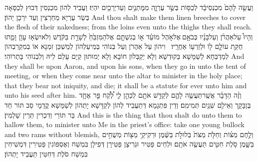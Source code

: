 {וַעֲשֵׂ֤ה לָהֶם֙ מִכְנְסֵי\maqqaf בָ֔ד לְכַסּ֖וֹת בְּשַׂ֣ר עֶרְוָ֑ה מִמׇּתְנַ֥יִם וְעַד\maqqaf יְרֵכַ֖יִם יִהְיֽוּ׃}
{וַעֲבֵיד לְהוֹן מִכְנְסִין דְּבוּץ לְכַסָּאָה בְּשַׂר עֶרְיָא מֵחַרְצִין וְעַד יִרְכָן יְהוֹן׃}
{And thou shalt make them linen breeches to cover the flesh of their nakedness; from the loins even unto the thighs they shall reach.}{}
{וְהָיוּ֩ עַל\maqqaf אַהֲרֹ֨ן וְעַל\maqqaf בָּנָ֜יו בְּבֹאָ֣ם \legarmeh  אֶל\maqqaf אֹ֣הֶל מוֹעֵ֗ד א֣וֹ בְגִשְׁתָּ֤ם אֶל\maqqaf הַמִּזְבֵּ֙חַ֙ לְשָׁרֵ֣ת בַּקֹּ֔דֶשׁ וְלֹא\maqqaf יִשְׂא֥וּ עָוֺ֖ן וָמֵ֑תוּ חֻקַּ֥ת עוֹלָ֛ם ל֖וֹ וּלְזַרְע֥וֹ אַחֲרָֽיו׃ \setuma }
{וִיהוֹן עַל אַהֲרֹן וְעַל בְּנוֹהִי בְּמֵיעַלְהוֹן לְמַשְׁכַּן זִמְנָא אוֹ בְמִקְרַבְהוֹן לְמַדְבְּחָא לְשַׁמָּשָׁא בְּקוּדְשָׁא וְלָא יְקַבְּלוּן חוֹבָא וְלָא יְמוּתוּן קְיָם עָלַם לֵיהּ וְלִבְנוֹהִי בָּתְרוֹהִי׃}
{And they shall be upon Aaron, and upon his sons, when they go in unto the tent of meeting, or when they come near unto the altar to minister in the holy place; that they bear not iniquity, and die; it shall be a statute for ever unto him and unto his seed after him.}{}
\newperek
{}
{וְזֶ֨ה הַדָּבָ֜ר אֲשֶֽׁר\maqqaf תַּעֲשֶׂ֥ה לָהֶ֛ם לְקַדֵּ֥שׁ אֹתָ֖ם לְכַהֵ֣ן לִ֑י לְ֠קַ֠ח פַּ֣ר אֶחָ֧ד בֶּן\maqqaf בָּקָ֛ר וְאֵילִ֥ם שְׁנַ֖יִם תְּמִימִֽם׃}
{וְדֵין פִּתְגָמָא דְּתַעֲבֵיד לְהוֹן לְקַדָּשָׁא יָתְהוֹן לְשַׁמָּשָׁא קֳדָמָי סַב תּוֹר חַד בַּר תּוֹרֵי וְדִכְרִין תְּרֵין שַׁלְמִין׃}
{And this is the thing that thou shalt do unto them to hallow them, to minister unto Me in the priest’s office: take one young bullock and two rams without blemish,}{}
{וְלֶ֣חֶם מַצּ֗וֹת וְחַלֹּ֤ת מַצֹּת֙ בְּלוּלֹ֣ת בַּשֶּׁ֔מֶן וּרְקִיקֵ֥י מַצּ֖וֹת מְשֻׁחִ֣ים בַּשָּׁ֑מֶן סֹ֥לֶת חִטִּ֖ים תַּעֲשֶׂ֥ה אֹתָֽם׃}
{וּלְחֵים פַּטִּיר וּגְרִיצָן פַּטִּירָן דְּפִילָן בִּמְשַׁח וְאֶסְפּוֹגִין פַּטִּירִין דִּמְשִׁיחִין בִּמְשַׁח סֹלֶת דְּחִטִּין תַּעֲבֵיד יָתְהוֹן׃}
